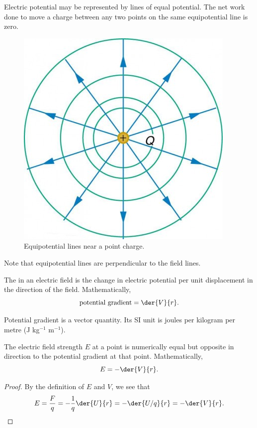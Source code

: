 Electric potential may be represented by lines of equal potential. The net work done to move a charge between any two points on the same equipotential line is zero.

\begin{figure}[H]
    \centering
    \includegraphics[scale=0.4]{media/Equipotential Lines.jpg}
    \caption{Equipotential lines near a point charge.\protect\footnotemark}
\end{figure}

Note that equipotential lines are perpendicular to the field lines.

\begin{definition}
    The  in an electric field is the change in electric potential per unit displacement in the direction of the field. Mathematically, \[\text{potential gradient} = \der{V}{r}.\]
\end{definition}

Potential gradient is a vector quantity. Its SI unit is joules per kilogram per metre (J kg$^{-1}$ m$^{-1}$).

\begin{proposition}
    The electric field strength $E$ at a point is numerically equal but opposite in direction to the potential gradient at that point. Mathematically, \[E = -\der{V}{r}.\]
\end{proposition}
\begin{proof}
    By the definition of $E$ and $V$, we see that \[E = \frac{F}{q} = -\frac1{q} \der{U}{r} = -\der{U/q}{r} = -\der{V}{r}.\]
\end{proof}

